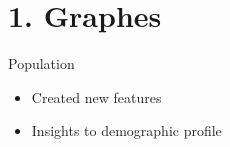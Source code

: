 \documentclass[xcolor=dvipsnames]{beamer}
\begin{document}
\section{1. Graphes}
		\begin{frame}{\centerline{\huge\textcolor{bscuro}{Population}}}

		\begin{itemize}
			\item Created new features 
			\item Insights to demographic profile 
		\end{itemize}
			\begin{figure}[!ht] 
				\centering
			\end{figure}
		\end{frame}


\end{document}
